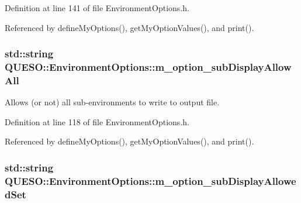 Definition at line 141 of file Environment\-Options.\-h.



Referenced by define\-My\-Options(), get\-My\-Option\-Values(), and print().

\hypertarget{class_q_u_e_s_o_1_1_environment_options_a3ebc67b0780a7c5632461154099ea54b}{
\subsubsection[{m\-\_\-option\-\_\-sub\-Display\-Allow\-All}]{\setlength{\rightskip}{0pt plus 5cm}std\-::string Q\-U\-E\-S\-O\-::\-Environment\-Options\-::m\-\_\-option\-\_\-sub\-Display\-Allow\-All\hspace{0.3cm}{\ttfamily [private]}}}\label{class_q_u_e_s_o_1_1_environment_options_a3ebc67b0780a7c5632461154099ea54b}


Allows (or not) all sub-\/environments to write to output file. 



Definition at line 118 of file Environment\-Options.\-h.



Referenced by define\-My\-Options(), get\-My\-Option\-Values(), and print().

\hypertarget{class_q_u_e_s_o_1_1_environment_options_aaf46a8974310e00a7569c004736a0f2b}{
\subsubsection[{m\-\_\-option\-\_\-sub\-Display\-Allowed\-Set}]{\setlength{\rightskip}{0pt plus 5cm}std\-::string Q\-U\-E\-S\-O\-::\-Environment\-Options\-::m\-\_\-option\-\_\-sub\-Display\-Allowed\-Set\hspace{0.3cm}{\ttfamily [private]}}}\label{class_q_u_e_s_o_1_1_environment_options_aaf46a8974310e00a7569c004736a0f2b}


